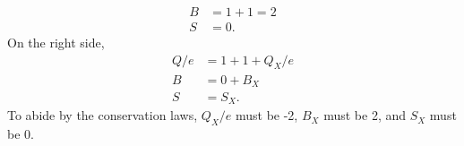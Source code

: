 \documentclass[11pt]{article}
\begin{document}
\begin{enumerate}[label=\textbf{\arabic*.}]
{\begin{enumerate}[label=\textbf{(\alph*)}]
{\begin{align*}
                        B&=1+1=2 \\
                        S&=0.
                    \end{align*}On the right side,
                    \begin{align*}
                        Q/e&=1+1+Q_X/e \\
                        B&=0+B_X \\
                        S&=S_X.
                    \end{align*}
                    To abide by the conservation laws, \(Q_X/e\) must be -2, \(B_X\) must be 2, and \(S_X\) must be 0.
                }
            \end{enumerate}
        }
    \end{enumerate}
\end{document}
